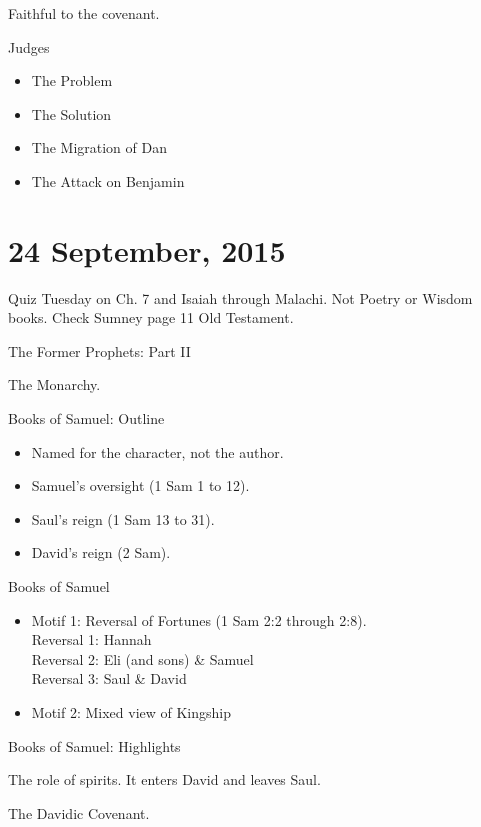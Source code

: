 \documentclass{article}
\begin{document}
    Faithful to the covenant.

    \centerline{Judges}

    \begin{itemize}
        \item The Problem
        \item The Solution
        \item The Migration of Dan
        \item The Attack on Benjamin
    \end{itemize}

\section{24 September, 2015}

    Quiz Tuesday on Ch. 7 and Isaiah through Malachi. Not Poetry or Wisdom books. Check Sumney page 11 Old Testament.

    \centerline{The Former Prophets: Part II}

    The Monarchy.

    \centerline{Books of Samuel: Outline}

    \begin{itemize}
        \item Named for the character, not the author.
        \item Samuel's oversight (1 Sam 1 to 12).
        \item Saul's reign (1 Sam 13 to 31).
        \item David's reign (2 Sam).
    \end{itemize}

    \centerline{Books of Samuel}

    \begin{itemize}
        \item Motif 1: Reversal of Fortunes (1 Sam 2:2 through 2:8). \\
            Reversal 1: Hannah \\
            Reversal 2: Eli (and sons) \& Samuel \\
            Reversal 3: Saul \& David
        \item Motif 2: Mixed view of Kingship
    \end{itemize}

    \centerline{Books of Samuel: Highlights}

    The role of spirits. It enters David and leaves Saul.

    The Davidic Covenant.
\end{document}
